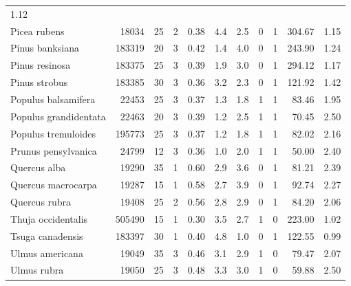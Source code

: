 \begin{landscape}
\begin{longtable}[]{@{}lrrrrrrrrrr@{}}
1.12\tabularnewline
Picea rubens & 18034 & 25 & 2 & 0.38 & 4.4 & 2.5 & 0 & 1 & 304.67 &
1.15\tabularnewline
Pinus banksiana & 183319 & 20 & 3 & 0.42 & 1.4 & 4.0 & 0 & 1 & 243.90 &
1.24\tabularnewline
Pinus resinosa & 183375 & 25 & 3 & 0.39 & 1.9 & 3.0 & 0 & 1 & 294.12 &
1.17\tabularnewline
Pinus strobus & 183385 & 30 & 3 & 0.36 & 3.2 & 2.3 & 0 & 1 & 121.92 &
1.42\tabularnewline
Populus balsamifera & 22453 & 25 & 3 & 0.37 & 1.3 & 1.8 & 1 & 1 & 83.46
& 1.95\tabularnewline
Populus grandidentata & 22463 & 20 & 3 & 0.39 & 1.2 & 2.5 & 1 & 1 &
70.45 & 2.50\tabularnewline
Populus tremuloides & 195773 & 25 & 3 & 0.37 & 1.2 & 1.8 & 1 & 1 & 82.02
& 2.16\tabularnewline
Prunus pensylvanica & 24799 & 12 & 3 & 0.36 & 1.0 & 2.0 & 1 & 1 & 50.00
& 2.40\tabularnewline
Quercus alba & 19290 & 35 & 1 & 0.60 & 2.9 & 3.6 & 0 & 1 & 81.21 &
2.39\tabularnewline
Quercus macrocarpa & 19287 & 15 & 1 & 0.58 & 2.7 & 3.9 & 0 & 1 & 92.74 &
2.27\tabularnewline
Quercus rubra & 19408 & 25 & 2 & 0.56 & 2.8 & 2.9 & 0 & 1 & 84.20 &
2.06\tabularnewline
Thuja occidentalis & 505490 & 15 & 1 & 0.30 & 3.5 & 2.7 & 1 & 0 & 223.00
& 1.02\tabularnewline
Tsuga canadensis & 183397 & 30 & 1 & 0.40 & 4.8 & 1.0 & 0 & 1 & 122.55 &
0.99\tabularnewline
Ulmus americana & 19049 & 35 & 3 & 0.46 & 3.1 & 2.9 & 1 & 0 & 79.47 &
2.07\tabularnewline
Ulmus rubra & 19050 & 25 & 3 & 0.48 & 3.3 & 3.0 & 1 & 0 & 59.88 &
2.50\tabularnewline
\bottomrule
\end{longtable}


\end{landscape}


